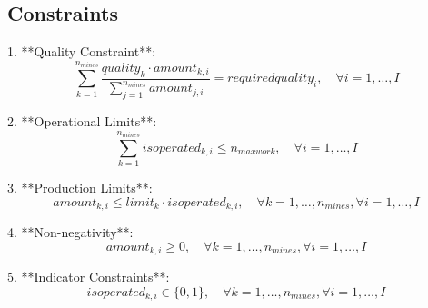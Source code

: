 \documentclass{article}
\begin{document}
\subsection*{Constraints}
1. **Quality Constraint**:
\[
\sum_{k=1}^{n_{mines}} \frac{quality_k \cdot amount_{k,i}}{\sum_{j=1}^{n_{mines}} amount_{j,i}} = requiredquality_i, \quad \forall i = 1, \ldots, I
\]

2. **Operational Limits**:
\[
\sum_{k=1}^{n_{mines}} isoperated_{k,i} \leq n_{maxwork}, \quad \forall i = 1, \ldots, I
\]

3. **Production Limits**:
\[
amount_{k,i} \leq limit_k \cdot isoperated_{k,i}, \quad \forall k = 1, \ldots, n_{mines}, \forall i = 1, \ldots, I
\]

4. **Non-negativity**:
\[
amount_{k,i} \geq 0, \quad \forall k = 1, \ldots, n_{mines}, \forall i = 1, \ldots, I
\]

5. **Indicator Constraints**:
\[
isoperated_{k,i} \in \{0, 1\}, \quad \forall k = 1, \ldots, n_{mines}, \forall i = 1, \ldots, I
\]
\end{document}
